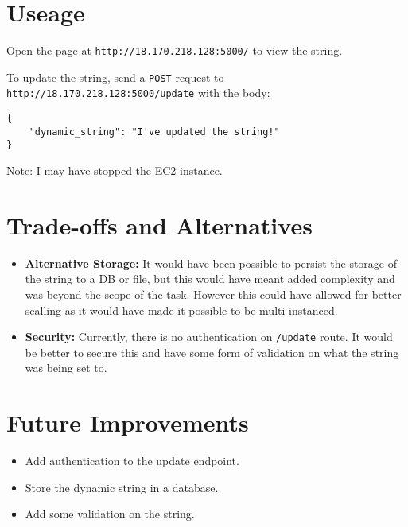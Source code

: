 \documentclass[12pt]{article}
\begin{document}
\section{Useage}
Open the page at \texttt{http://18.170.218.128:5000/} to view the string. 

To update the string, send a \texttt{POST} request to \texttt{http://18.170.218.128:5000/update} with the body:
\begin{lstlisting}
{
    "dynamic_string": "I've updated the string!"
}
\end{lstlisting}

Note: I may have stopped the EC2 instance.

\section{Trade-offs and Alternatives}
\begin{itemize}
    \item \textbf{Alternative Storage:} It would have been possible to persist the storage of the string to a DB or file, but this would have meant added complexity and was beyond the scope of the task. However this could have allowed for better scalling as it would have made it possible to be multi-instanced.
    \item \textbf{Security:} Currently, there is no authentication on \texttt{/update} route. It would be better to secure this and have some form of validation on what the string was being set to. 
\end{itemize}

\section{Future Improvements}
\begin{itemize}
    \item Add authentication to the update endpoint.
    \item Store the dynamic string in a database.
    \item Add some validation on the string. 
\end{itemize}
\end{document}
